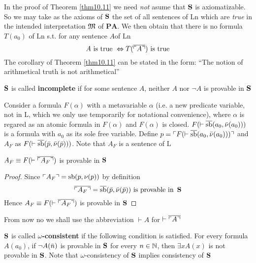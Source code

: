 \documentclass[11pt]{article}
\def \PA {\textbf{PA}}
\def \sb {\text{sb}}
\def \ovesb {\ove{\sb}}
\newcommand{\ovecor}[1] {\ove{\ucorner{#1}}}
\begin{document}
In the proof of Theorem \ref{thm10.11} we need \emph{not} asume that \(\operatorname{\textbf{S}}\) is axiomatizable. So we may
take as the axioms of \(\operatorname{\textbf{S}}\) the set of all sentences of Ln which are \emph{true} in the intended
interpretation \(\mathfrak{M}\) of \(\PA\). We then obtain that there is no formula \(T(a_0)\) of Ln s.t.
for any sentence \(A\)of Ln
\begin{equation*}
A\text{ is true }\Leftrightarrow T(\ovecor{A})\text{ is true}
\end{equation*}
The corollary of Theorem \ref{thm10.11} can be stated in the form: ``The notion of arithmetical
truth is not arithmetical''
\begin{definition}[]
\(\operatorname{\textbf{S}}\) is called \textbf{incomplete} if for some sentence \(A\), neither \(A\) nor \(\neg A\) is provable in \(\operatorname{\textbf{S}}\)
\end{definition}

\begin{definition}[]
Consider a formula \(F(\alpha)\) with a metavariable \(\alpha\) (i.e. a new predicate variable, not in L, which
we only use temporarily for notational convenience), where \(\alpha\) is regared as an atomic formula
in \(F(\alpha)\) and \(F(\alpha)\) is closed. \(F(\vdash \ove{\sb}(a_0,\barnu(a_0)))\) is a formula with \(a_0\)
as its sole free variable. Define \(p=\ucorner{F(\vdash \ove{\sb}(a_0,\barnu(a_0)))}\) and \(A_F\) as
\(F(\vdash \ove{\sb}(\barp,\barnu(\barp)))\). Note that \(A_F\) is a sentence of L
\end{definition}

\begin{lemma}[]
\label{lemma10.14}
\(A_F\equiv F(\vdash \ovecor{A_F})\) is provable in \(\operatorname{\textbf{S}}\)
\end{lemma}

\begin{proof}
Since \(\ucorner{A_F}=\sb(p,\nu(p))\) by definition
\begin{equation*}
\ovecor{A_F}=\ovesb(\barp,\barnu(\barp))\text{ is provable in }\bS
\end{equation*}
Hence \(A_F\equiv F(\vdash \ovecor{A_F})\) is provable in \(\operatorname{\textbf{S}}\)
\end{proof}

From now no we shall use the abbreviation \(\vdash A\) for \(\vdash\ovecor{A}\)

\begin{definition}[]
\(\operatorname{\textbf{S}}\) is called \textbf{\(\omega\)-consistent} if the following condition is satisfied. For every
formula \(A(a_0)\), if \(\neg A(\bar{n})\) is provable in \(\operatorname{\textbf{S}}\) for every \(n\in\mathbb{N}\),
then \(\exists xA(x)\) is not provable in \(\operatorname{\textbf{S}}\). Note that \(\omega\)-consistency of \(\operatorname{\textbf{S}}\) implies
consistency of \(\operatorname{\textbf{S}}\)
\end{definition}
\end{document}
